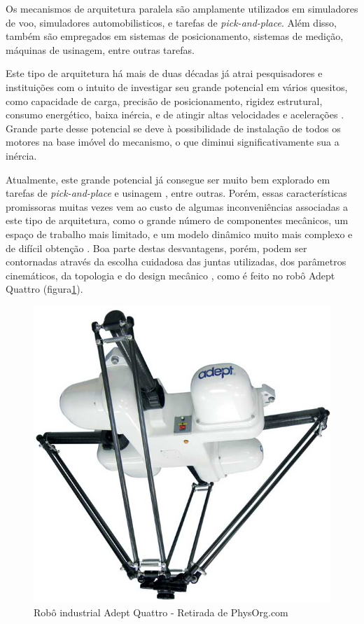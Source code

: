 \documentclass[]{politex}
\begin{document}
Os mecanismos de arquitetura paralela são amplamente utilizados em simuladores de voo, simuladores automobilisticos, e tarefas de {\em pick-and-place}. Além disso, também são empregados em sistemas de posicionamento, sistemas de medição, máquinas de usinagem, entre outras tarefas. 

Este tipo de arquitetura há mais de duas décadas já atrai pesquisadores e instituições com o intuito de investigar seu grande potencial em vários quesitos, como capacidade de carga, precisão de posicionamento, rigidez estrutural, consumo energético, baixa inércia, e de atingir altas velocidades e acelerações \cite{Cheng, Khalil, Merlet2002, Pashkevich, Tsai}. Grande parte desse potencial se deve à possibilidade de instalação de todos os motores na base imóvel do mecanismo, o que diminui significativamente sua a inércia. 

Atualmente, este grande potencial já consegue ser muito bem explorado em tarefas de {\em pick-and-place} \cite{Clavel} e usinagem \cite{Pashkevich}, entre outras. Porém, essas características promissoras muitas vezes vem ao custo de algumas inconveniências associadas a este tipo de arquitetura, como o grande número de componentes mecânicos, um espaço de trabalho mais limitado, e um modelo dinâmico muito mais complexo e de difícil obtenção \cite{Rynaldo, Merlet2002}. Boa parte destas desvantagens, porém, podem ser contornadas através da escolha cuidadosa das juntas utilizadas, dos parâmetros cinemáticos, da topologia e do design mecânico \cite{Briot, Campos, Jiang, Zhan}, como é feito no robô Adept Quattro (figura\ref{fig:Mecanismo}).

\begin{figure}[h]
	\centering
	\includegraphics[scale=0.17]{../figures/theadeptquat.jpg}  
	\caption{Robô industrial Adept Quattro - Retirada de PhysOrg.com}
	\label{fig:Mecanismo}
\end{figure}
\end{document}
